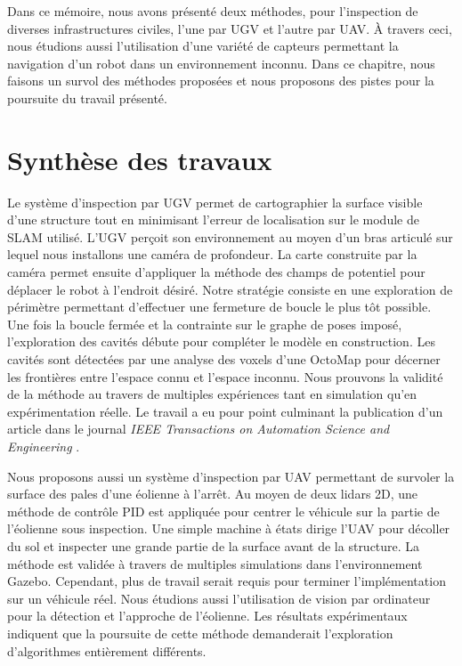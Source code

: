 \label{sec:Conclusion}

Dans ce mémoire, nous avons présenté deux méthodes, pour l'inspection de diverses infrastructures civiles, l'une par UGV et l'autre par UAV. À travers ceci, nous étudions aussi l'utilisation d'une variété de capteurs permettant la navigation d'un robot dans un environnement inconnu. Dans ce chapitre, nous faisons un survol des méthodes proposées et nous proposons des pistes pour la poursuite du travail présenté.

\section{Synthèse des travaux}

Le système d'inspection par UGV permet de cartographier la surface visible d'une structure tout en minimisant l'erreur de localisation sur le module de SLAM utilisé. L'UGV perçoit son environnement au moyen d'un bras articulé sur lequel nous installons une caméra de profondeur. La carte construite par la caméra permet ensuite d'appliquer la méthode des champs de potentiel pour déplacer le robot à l'endroit désiré. Notre stratégie consiste en une exploration de périmètre permettant d'effectuer une fermeture de boucle le plus tôt possible. Une fois la boucle fermée et la contrainte sur le graphe de poses imposé, l'exploration des cavités débute pour compléter le modèle en construction. Les cavités sont détectées par une analyse des voxels d'une OctoMap pour décerner les frontières entre l'espace connu et l'espace inconnu. Nous prouvons la validité de la méthode au travers de multiples expériences tant en simulation qu'en expérimentation réelle. Le travail a eu pour point culminant la publication d'un article dans le journal \emph{IEEE Transactions on Automation Science and Engineering} \citep{Ramanagopal2017}.

Nous proposons aussi un système d'inspection par UAV permettant de survoler la surface des pales d'une éolienne à l'arrêt. Au moyen de deux lidars 2D, une méthode de contrôle PID est appliquée pour centrer le véhicule sur la partie de l'éolienne sous inspection. Une simple machine à états dirige l'UAV pour décoller du sol et inspecter une grande partie de la surface avant de la structure. La méthode est validée à travers de multiples simulations dans l'environnement Gazebo. Cependant, plus de travail serait requis pour terminer l'implémentation sur un véhicule réel. Nous étudions aussi l'utilisation de vision par ordinateur pour la détection et l'approche de l'éolienne. Les résultats expérimentaux indiquent que la poursuite de cette méthode demanderait l'exploration d'algorithmes entièrement différents.


